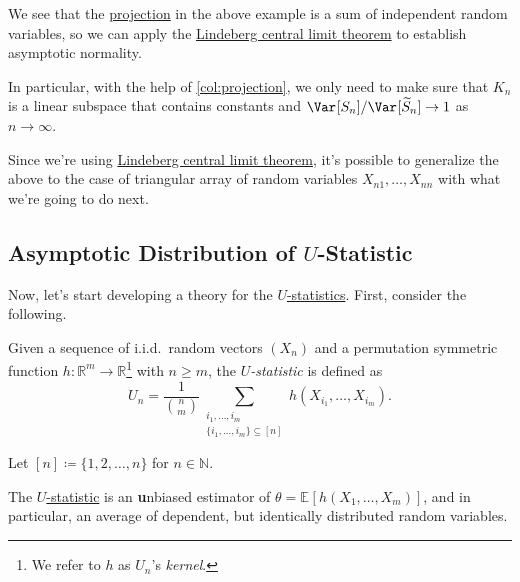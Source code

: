 We see that the \hyperref[def:projection]{projection} in the above example is a sum of independent random variables, so we can apply the \hyperref[thm:Lindeberg-CLT]{Lindeberg central limit theorem} to establish asymptotic normality.

\begin{remark}
	In particular, with the help of \autoref{col:projection}, we only need to make sure that \(K_n\) is a linear subspace that contains constants and \(\Var_{}[S_n] / \Var_{}[\widetilde{S} _n] \to 1\) as \(n \to \infty \).
\end{remark}

\begin{remark}
	Since we're using \hyperref[thm:Lindeberg-CLT]{Lindeberg central limit theorem}, it's possible to generalize the above to the case of triangular array of random variables \(X_{n1}, \dots , X_{nn}\) with what we're going to do next.
\end{remark}

\subsection{Asymptotic Distribution of \(U\)-Statistic}
Now, let's start developing a theory for the \hyperref[def:U-statistic]{\(U\)-statistics}. First, consider the following.

\begin{definition}[\(U\)-statistic]\label{def:U-statistic}
	Given a sequence of i.i.d.\ random vectors \((X_n)\) and a permutation symmetric function \(h \colon \mathbb{R} ^m \to \mathbb{R} \)\footnote{We refer to \(h\) as \(U_n\)'s \emph{kernel}.} with \(n \geq m\), the \emph{\(U\)-statistic} is defined as
	\[
		U_n
		= \frac{1}{\binom{n}{m}} \sum_{\substack{i_1, \dots , i_m \\ \{ i_1, \dots , i_m \} \subseteq [n] }} h(X_{i_1}, \dots , X_{i_m}).
	\]
\end{definition}

\begin{notation}
	Let \([n] \coloneqq \{ 1, 2, \dots , n \} \) for \(n \in \mathbb{N} \).
\end{notation}

\begin{remark}
	The \hyperref[def:U-statistic]{\(U\)-statistic} is an \textbf{u}nbiased estimator of \(\theta = \mathbb{E}_{}[h(X_1, \dots , X_m)] \), and in particular, an average of dependent, but identically distributed random variables.
\end{remark}

